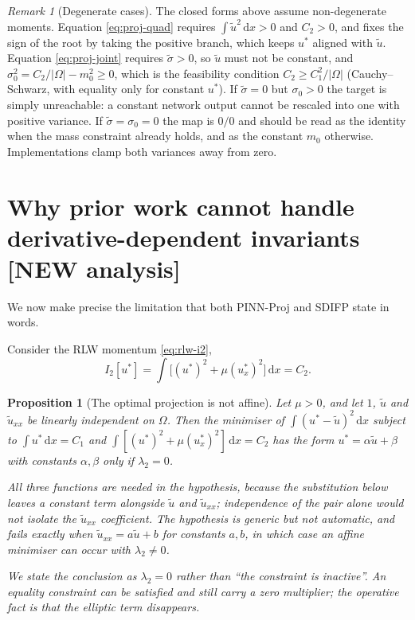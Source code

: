 \documentclass[11pt,a4paper]{article}
\newtheorem{proposition}{Proposition}
\theoremstyle{remark}
\newtheorem{remark}{Remark}
\newcommand{\dx}{\,\mathrm{d}x}
\newcommand{\ut}{\tilde{u}}
\newcommand{\us}{u^{*}}
\newcommand{\Om}{\Omega}
\begin{document}
\begin{remark}[Degenerate cases]
The closed forms above assume non-degenerate moments. Equation
\eqref{eq:proj-quad} requires $\int\ut^2\dx > 0$ and $C_2 > 0$, and fixes the
sign of the root by taking the positive branch, which keeps $\us$ aligned with
$\ut$. Equation \eqref{eq:proj-joint} requires $\tilde\sigma > 0$, so $\ut$
must not be constant, and $\sigma_0^2 = C_2/|\Om| - m_0^2 \geq 0$, which is the
feasibility condition $C_2 \geq C_1^2/|\Om|$ (Cauchy--Schwarz, with equality
only for constant $\us$). If $\tilde\sigma = 0$ but $\sigma_0 > 0$ the target is
simply unreachable: a constant network output cannot be rescaled into one with
positive variance. If $\tilde\sigma = \sigma_0 = 0$ the map is $0/0$ and should
be read as the identity when the mass constraint already holds, and as the
constant $m_0$ otherwise. Implementations clamp both variances away from zero.
\end{remark}

\section{Why prior work cannot handle derivative-dependent invariants \textbf{[NEW analysis]}}

We now make precise the limitation that both PINN-Proj and SDIFP state in words.

Consider the RLW momentum \eqref{eq:rlw-i2},
\begin{equation}
I_2[\us] = \int \Big[(\us)^2 + \mu(\us_x)^2\Big]\dx = C_2 .
\end{equation}

\begin{proposition}[The optimal projection is not affine]
\label{prop:not-affine}
Let $\mu > 0$, and let $1$, $\ut$ and $\ut_{xx}$ be linearly independent on
$\Om$. Then the minimiser of $\int(\us-\ut)^2\dx$ subject to
$\int\us\dx = C_1$ and $\int[(\us)^2+\mu(\us_x)^2]\dx = C_2$ has the form
$\us = \alpha\ut + \beta$ with constants $\alpha,\beta$ \emph{only if}
$\lambda_2 = 0$.

All three functions are needed in the hypothesis, because the substitution
below leaves a constant term alongside $\ut$ and $\ut_{xx}$; independence of
the pair alone would not isolate the $\ut_{xx}$ coefficient. The hypothesis is
generic but not automatic, and fails exactly when $\ut_{xx} = a\ut + b$ for
constants $a,b$, in which case an affine minimiser can occur with
$\lambda_2 \neq 0$.

We state the conclusion as $\lambda_2 = 0$ rather than ``the constraint is
inactive''. An equality constraint can be satisfied and still carry a zero
multiplier; the operative fact is that the elliptic term disappears.
\end{proposition}
\end{document}
